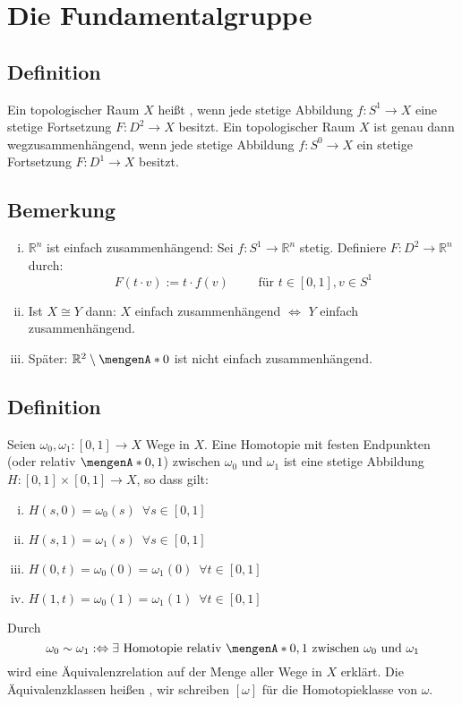 \section{Die Fundamentalgruppe} %
\label{sec:9}

\subsection[Definition: Einfach zusammenhängender topologischer Raum]{Definition} %
\label{sub:91}
Ein topologischer Raum $X$ heißt , wenn jede stetige Abbildung $f : S^1 \to X$ eine stetige
Fortsetzung $F : D^2 \to X$ besitzt.
Ein topologischer Raum $X$ ist genau dann wegzusammenhängend, wenn jede stetige Abbildung $f : S^0 \to X$ ein stetige Fortsetzung $F : D^1 \to X$ besitzt.

\subsection[Bemerkungen zu einfach zusammenhängenden Räumen]{Bemerkung} %
\label{sub:92}
\begin{enumerate}[(i)]
	\item $\mathds{R}^n$ ist einfach zusammenhängend: Sei $f : S^1 \to \mathds{R}^n$ stetig. Definiere $F : D^2 \to \mathds{R}^n$ durch:
	\[
		F(t \cdot v) := t \cdot f(v) \qquad \text{ für } t \in [0,1], v \in S^1
	\]
	\item Ist $X \cong Y$ dann: $X$ einfach zusammenhängend $\Leftrightarrow$ $Y$ einfach zusammenhängend.
	\item Später: $\mathds{R}^2 \setminus \set{0}$ ist nicht einfach zusammenhängend.
\end{enumerate}

\subsection[Definition: Homotopie zwischen Wegen]{Definition} %
\label{sub:93}
Seien $\omega_0, \omega_1 : [0,1] \to X$ Wege in $X$. Eine Homotopie mit festen Endpunkten (oder relativ $\set{0,1}$) zwischen $\omega_0$ und $\omega_1$ ist eine stetige 
Abbildung $H : [0,1] \times [0,1] \to X$, so dass gilt:
\begin{enumerate}[(i)]
	\item $H(s,0)= \omega_0(s) \enspace \forall s \in [0,1]$
	\item $H(s,1) = \omega_1(s) \enspace \forall s \in [0,1]$
	\item $H(0,t) = \omega_0(0)= \omega_1(0) \enspace \forall t \in [0,1]$
	\item $H(1,t) = \omega_0(1) = \omega_1(1) \enspace \forall t \in [0,1]$
\end{enumerate}
Durch 
\[
	\omega_0 \sim \omega_1 :\Leftrightarrow \exists \text{ Homotopie relativ } \set{0,1} \text{ zwischen } \omega_0 \text{ und } \omega_1
\]
wird eine Äquivalenzrelation auf der Menge aller Wege in $X$ erklärt. Die Äquivalenzklassen heißen , wir schreiben $[\omega]$ für die 
Homotopieklasse von $\omega$. 

